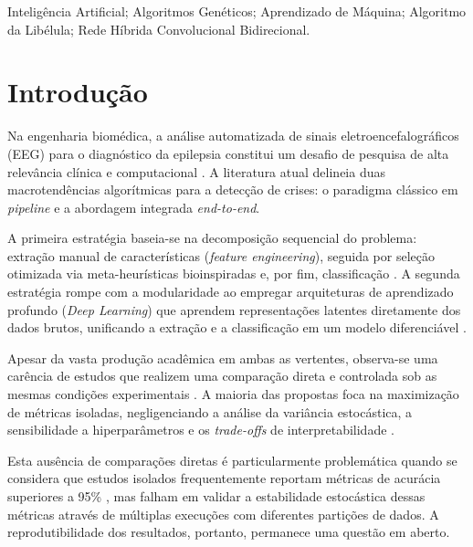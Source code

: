 \documentclass[alpha-refs,brazilian]{CC-EC_TF-TC}
\begin{document}
\begin{frontmatter}
\begin{resumo}
\end{resumo}
\begin{palavras_chave}
	Inteligência Artificial; Algoritmos Genéticos; Aprendizado de Máquina; Algoritmo da Libélula; Rede Híbrida Convolucional Bidirecional.
\end{palavras_chave}
\end{frontmatter}
\clearpage
\section{Introdução}

Na engenharia biomédica, a análise automatizada de sinais eletroencefalográficos (EEG) para o diagnóstico da epilepsia constitui um desafio de pesquisa de alta relevância clínica e computacional \citep{Acharya2013,Subasi2019}. A literatura atual delineia duas macrotendências algorítmicas para a detecção de crises: o paradigma clássico em \textit{pipeline} e a abordagem integrada \textit{end-to-end}.

A primeira estratégia baseia-se na decomposição sequencial do problema: extração manual de características (\textit{feature engineering}), seguida por seleção otimizada via meta-heurísticas bioinspiradas e, por fim, classificação \citep{Guyon2003,Emary2016,Mirjalili2016,Martinez-Vargas2022evaluation}. A segunda estratégia rompe com a modularidade ao empregar arquiteturas de aprendizado profundo (\textit{Deep Learning}) que aprendem representações latentes diretamente dos dados brutos, unificando a extração e a classificação em um modelo diferenciável \citep{Roy2019Deep,Lu2019Residual,Shoeibi2021}.

Apesar da vasta produção acadêmica em ambas as vertentes, observa-se uma carência de estudos que realizem uma comparação direta e controlada sob as mesmas condições experimentais \citep{Acharya2021characterization, Martinez-Vargas2022evaluation}. A maioria das propostas foca na maximização de métricas isoladas, negligenciando a análise da variância estocástica, a sensibilidade a hiperparâmetros e os \textit{trade-offs} de interpretabilidade \citep{Cherukuvada2023,Chantar2021Hybrid}. 

Esta ausência de comparações diretas é particularmente problemática quando se considera que estudos isolados frequentemente reportam métricas de acurácia superiores a 95\% \citep{Yogarajan2023, AlGhamdi2024}, mas falham em validar a estabilidade estocástica dessas métricas através de múltiplas execuções com diferentes partições de dados. A reprodutibilidade dos resultados, portanto, permanece uma questão em aberto.
\end{document}
